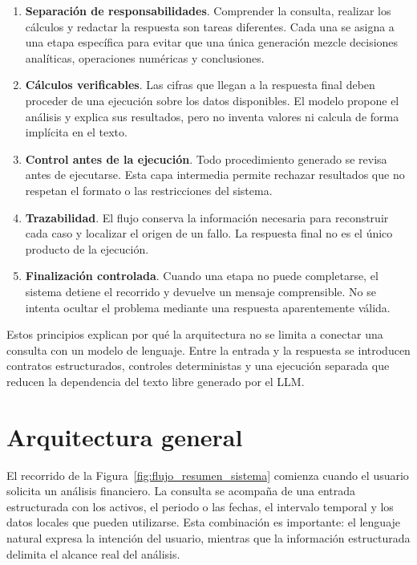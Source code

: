 \begin{enumerate}
    \item \textbf{Separación de responsabilidades}. Comprender la consulta, realizar los cálculos y redactar la respuesta son tareas diferentes. Cada una se asigna a una etapa específica para evitar que una única generación mezcle decisiones analíticas, operaciones numéricas y conclusiones.
    \item \textbf{Cálculos verificables}. Las cifras que llegan a la respuesta final deben proceder de una ejecución sobre los datos disponibles. El modelo propone el análisis y explica sus resultados, pero no inventa valores ni calcula de forma implícita en el texto.
    \item \textbf{Control antes de la ejecución}. Todo procedimiento generado se revisa antes de ejecutarse. Esta capa intermedia permite rechazar resultados que no respetan el formato o las restricciones del sistema.
    \item \textbf{Trazabilidad}. El flujo conserva la información necesaria para reconstruir cada caso y localizar el origen de un fallo. La respuesta final no es el único producto de la ejecución.
    \item \textbf{Finalización controlada}. Cuando una etapa no puede completarse, el sistema detiene el recorrido y devuelve un mensaje comprensible. No se intenta ocultar el problema mediante una respuesta aparentemente válida.
\end{enumerate}

Estos principios explican por qué la arquitectura no se limita a conectar una consulta con un modelo de lenguaje. Entre la entrada y la respuesta se introducen contratos estructurados, controles deterministas y una ejecución separada que reducen la dependencia del texto libre generado por el LLM.

\section{Arquitectura general}

El recorrido de la Figura~\ref{fig:flujo_resumen_sistema} comienza cuando el usuario solicita un análisis financiero. La consulta se acompaña de una entrada estructurada con los activos, el periodo o las fechas, el intervalo temporal y los datos locales que pueden utilizarse. Esta combinación es importante: el lenguaje natural expresa la intención del usuario, mientras que la información estructurada delimita el alcance real del análisis.

